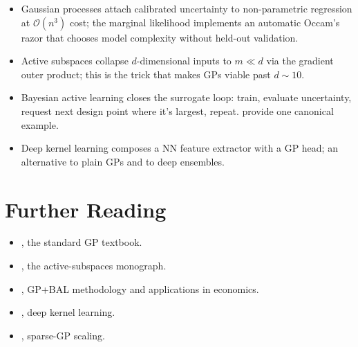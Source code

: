 \documentclass[11pt,a4paper]{report}
\begin{document}
\begin{keyinsightbox}
\begin{itemize}[itemsep=2pt, leftmargin=*]
\item Gaussian processes attach calibrated uncertainty to non-parametric regression at $\mathcal{O}(n^3)$ cost; the marginal likelihood implements an automatic Occam's razor that chooses model complexity without held-out validation.
\item Active subspaces collapse $d$-dimensional inputs to $m \ll d$ via the gradient outer product; this is the trick that makes GPs viable past $d \sim 10$.
\item Bayesian active learning closes the surrogate loop: train, evaluate uncertainty, request next design point where it's largest, repeat.  \citet{SCHEIDEGGER201968} provide one canonical example.
\item Deep kernel learning composes a NN feature extractor with a GP head; an alternative to plain GPs and to deep ensembles.
\end{itemize}
\end{keyinsightbox}

\section*{Further Reading}
\begin{itemize}[itemsep=2pt]
\item \citet{Rasmussen:2005:GPM:1162254}, the standard GP textbook.
\item \citet{constantine2015active}, the active-subspaces monograph.
\item \citet{rennerscheidegger_2018, SCHEIDEGGER201968}, GP+BAL methodology and applications in economics.
\item \citet{wilson2016deep}, deep kernel learning.
\item \citet{titsias2009variational, hensman2013gaussian}, sparse-GP scaling.
\end{itemize}
\end{document}
